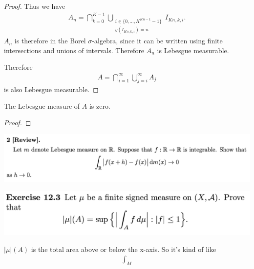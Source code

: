 \begin{proof}
  Thus we have
  \begin{align*}
    A_n = \bigcap_{k=0}^{K-1}\bigcup_{\substack{i\in \{0, \ldots, K^{Kn - 1} - 1\}\\g(I_{Kn, k, i}) = n}} I_{Kn, k, i}.
  \end{align*}
  $A_n$ is therefore in the Borel $\sigma$-algebra, since it can be written using finite intersections and
  unions of intervals. Therefore $A_n$ is Lebesgue measurable.

  Therefore
  \begin{align*}
    A = \bigcap_{i=1}^\infty \bigcup_{j=i}^\infty A_j
  \end{align*}
  is also Lebesgue measurable.

 \end{proof}

 \begin{claim*}
   The Lebesgue measure of $A$ is zero.
 \end{claim*}

 \begin{proof}

 \end{proof}

\newpage
\begin{mdframed}
\includegraphics[width=400pt]{img/analysis--berkeley-202a-hw10-5e9e.png}
\end{mdframed}


\newpage
\begin{mdframed}
\includegraphics[width=400pt]{img/analysis--berkeley-202a-hw10-551e.png}
\end{mdframed}

\begin{intuition*}
  $|\mu|(A)$ is the total area above or below the x-axis. So it's kind of like
  \begin{align*}
    \int_M
  \end{align*}
\end{intuition*}

